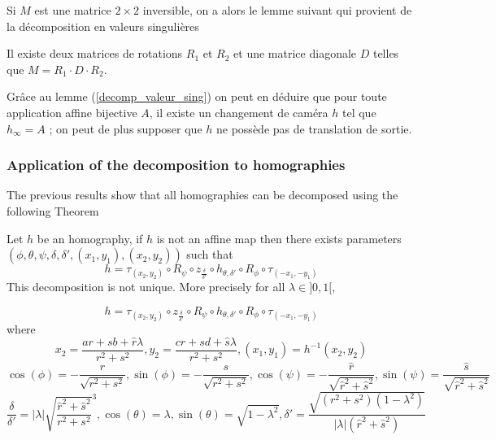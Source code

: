 \begin{remarque}
Si  $M$ est une matrice $2\times 2$ inversible, on a alors le lemme suivant qui provient de la décomposition en valeurs singulières \cite{morel2009asift}
\begin{lem}
Il existe deux matrices de rotations $R_1$ et $R_2$  et une matrice diagonale $D$ telles que $M = R_1 \cdot D \cdot R_2$.
\label{decomp_valeur_sing}
\end{lem}
Grâce au lemme (\ref{decomp_valeur_sing}) on peut en déduire que pour toute application affine bijective $A$, il existe un changement de caméra $h$ tel que $h_\infty = A$ ; on peut de plus supposer que $h$ ne possède pas de translation de sortie.
\end{remarque}





\subsubsection{Application of the decomposition to homographies}
The previous results show that all homographies can be decomposed using the following Theorem

\begin{thm}
Let $h$ be an homography, if $h$ is not an affine map then there exists parameters $(\phi,\theta,\psi,\delta,\delta',(x_1,y_1),(x_2,y_2))$ such that
\begin{equation*}
h = \tau_{(x_2,y_2)} \circ R_{\psi} \circ z_{\frac{\delta}{\delta'}} \circ h_{\theta,\delta'} \circ R_{\phi} \circ \tau_{(-x_1,-y_1)}
\end{equation*}
This decomposition is not unique. More precisely for all $\lambda \in ]0,1[$,

  \begin{equation*}
h = \tau_{(x_2,y_2)} \circ z_{\frac{\delta}{\delta'}}  \circ R_{\psi} \circ h_{\theta,\delta'} \circ R_{\phi} \circ \tau_{(-x_1,-y_1)}
  \end{equation*}
  where 
 \begin{equation*}
x_2=\frac{ar+sb+\hat r \lambda}{r^2 +s^2}, y_2=\frac{cr+sd+\hat s \lambda}{r^2 +s^2}, (x_1 , y_1) = h^{-1}(x_{2},y_{2})
  \end{equation*}
 \begin{equation*}
 \cos( \phi )= - \frac{r}{\sqrt{r^2 + s^2}}, \sin( \phi )= - \frac{s}{\sqrt{r^2 + s^2}},\cos( \psi ) =- \frac{\hat r}{\sqrt{\hat r^2 + \hat s^2}}, \sin( \psi ) = \frac{\hat s}{\sqrt{\hat r^2 + \hat s^2}}
 \end{equation*}
 \begin{equation*}
 \frac{\delta}{\delta'}=|\lambda|\sqrt{\frac{\hat r^2 + \hat s^2}{r^2 + s^2}}^{3}, \cos(\theta)=\lambda, \sin(\theta)=\sqrt{1-\lambda^2}, \delta'=  \frac{\sqrt{(r^2 + s^2)(1-\lambda^2)}}{|\lambda| (\hat r^2+\hat s^2)}
 \end{equation*}
\label{thepropdecomp}
\end{thm}

